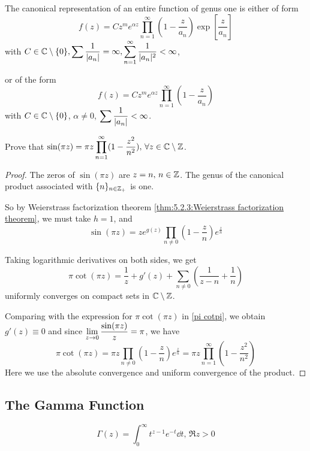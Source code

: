 \begin{example}
    The canonical representation of  an entire function of genus one is either of form 
    \begin{equation}
        f(z)=Cz^m e^{\alpha z}\prod_{n=1}^\infty(1-\frac{z}{a_n})\exp\left[\frac{z}{a_n}\right]
    \end{equation}
    with  $ C\in\mathbb C\setminus\{0\},\displaystyle\sum\frac{1}{|a_n|}=\infty,\sum_{n=1}^\infty\frac{1}{|a_n|^2}<\infty $,

    or of the form 
    \begin{equation}
        f(z)=Cz^m e^{\alpha z}\prod_{n=1}^\infty(1-\frac{z}{a_n})
    \end{equation}
    with  $ C\in\mathbb C\setminus\{0\} $, $ \alpha\neq 0 $,  $ \displaystyle\sum\frac{1}{|a_n|}<\infty $.   
\end{example}
\begin{example}
    Prove that  $ \sin(\pi z)=\pi z\displaystyle\prod_{n=1}^\infty(1-\frac{z^2}{n^2}),\,\forall z\in \mathbb C\setminus\mathbb Z $.
\end{example}
\begin{proof}
    The zeros of  $ \sin(\pi z) $ are  $ z=n,\,n\in \mathbb Z $. The genus of the canonical product associated with  $ \{n\}_{n\in\mathbb Z_+} $ is one.
    
    So by Weierstrass factorization theorem \ref{thm:5.2.3:Weierstrass factorization theorem}, we must take  $ h=1 $, and 
    \begin{equation}
        \sin(\pi z)=z e^{g(z)}\prod_{n\neq 0}(1-\frac{z}{n})e^{\frac{z}{n}}
    \end{equation} 

    Taking logarithmic derivatives on both sides, we get 
    \begin{equation}
        \pi \cot(\pi z)=\frac{1}{z}+g'(z)+\sum_{n\neq 0}\left(\frac{1}{z-n}+\frac{1}{n}\right)
    \end{equation}
    uniformly converges on compact sets in  $ \mathbb C\setminus\mathbb Z $.
    
    Comparing with the expression for  $ \pi \cot(\pi z) $ in \eqref{pi cotpi}, we obtain  $ g'(z)\equiv 0 $ and since
    $ \displaystyle\lim_{z\to0} \frac{\sin(\pi z)}{z}=\pi $, we have 
    \begin{equation*}
        \pi \cot(\pi z)=\pi z\prod_{n\neq 0}(1-\frac{z}{n})e^{\frac{z}{n}}=\pi z\prod_{n=1}^\infty (1-\frac{z^2}{n^2})
    \end{equation*}
    Here we use the absolute convergence and uniform convergence of the product.
\end{proof}

\subsection{The Gamma Function}
\begin{equation}
    \Gamma(z)=\int_0^\infty t^{z-1}e^{-t}\dd t,\,\Re z>0
\end{equation}